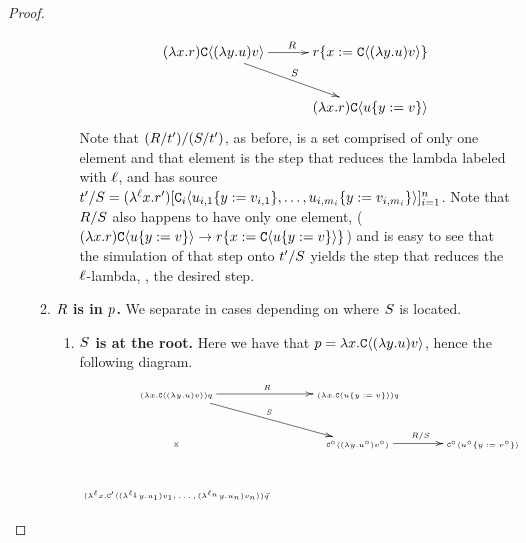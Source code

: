 \begin{proof}
\begin{gonzaenv}
\begin{enumerate}
\begin{enumerate}
\begin{enumerate}
\[            \xymatrix@C=1cm{
              (\lam{\var}{\tmfour}) \conof{(\lam{\vartwo}{\tmthree}) \tmthreevariant}
                \ar@{->}[r]^{\redex} \ar@{->}[rd]^{\redextwo}
                  & \subs{\tmfour}{\var}{\conof{(\lam{\vartwo}{\tmthree}) \tmthreevariant}} \\
                & (\lam{\var}{\tmfour}) \conof{\subs{\tmthree}{\vartwo}{\tmthreevariant}} \\
            }
            \]
            Note that $(R / t') / (S / t')$, as before, is a set comprised of only one element
            and that element is the step that reduces the lambda labeled with $\ell$, and has source
            $t' / S = (\lambda^{\ell} x. r')[
              \mathtt{C}_i\langle u_{i,1}\{y := v_{i,1}\}, \hdots, u_{i,m_i}\{y := v_{i,m_i}\}\rangle]_{i=1}^n$.
            Note that $R / S$ also happens to have only one element,
            ($(\lambda x. r) \mathtt{C}\langle u\{y := v\}\rangle \to
              r\{x := \mathtt{C}\langle u\{y := v\}\rangle\}$)
            and is easy to see that the simulation of that step onto
            $t' / S$
            yields the step that reduces the $\ell$-lambda, \ie, the desired step.
        \end{enumerate}
      \item {\bf $R$ is in $p$.} We separate in cases depending on where $S$ is located.
        \begin{enumerate}
          \item {\bf $S$ is at the root.}
            Here we have that $p = \lambda x. \mathtt{C}\langle(\lambda y. u) v\rangle$, hence
            the following diagram.
            \[
            {\tiny
            \xymatrix@C=1cm{
              (\lam{\var}{\conof{(\lam{\vartwo}{\tmthree}) \tmthreevariant}}) \tmsix
                \ar@{->}[r]^{\redex} \ar@{->}[rd]^{\redextwo} \ar@{}[dd]|*=0[@]{\rtimes}
                  & (\lam{\var}{\conof{\subs{\tmthree}{\vartwo}{\tmthreevariant}}}) \tmsix & \\
                & \con^{\circ}\of{(\lam{\vartwo}{\tmthree^{\circ}}) \tmthreevariant^{\circ}}
                  \ar@{->}[r]^{\redex / \redextwo}
                  & \con^{\circ}\of{\subs{\tmthree^{\circ}}{\vartwo}{\tmthreevariant^{\circ}}} \\
              (\lamp{\lab}{\var}{\con'\of{(\lamp{\lab_1}{\vartwo}{\tmthree_1}) \tmthreevariant_1, \hdots, (\lamp{\lab_n}{\vartwo}{\tmthree_n}) \tmthreevariant_n}}) \ls{\tmsix}
}}\]
\end{enumerate}
\end{enumerate}
\end{enumerate}
\end{gonzaenv}
\end{proof}
